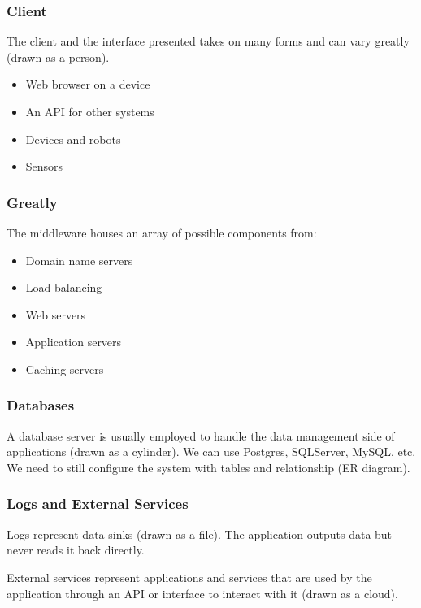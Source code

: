\subsubsection{Client}\label{ssub:clinet_was}

The client and the interface presented takes on many forms and can vary greatly (drawn as a person).
\begin{itemize}
	\item Web browser on a device
	\item An API for other systems
	\item Devices and robots
	\item Sensors
\end{itemize}

\subsubsection{Greatly}\label{ssub:greatly}

The middleware houses an array of possible components from:
\begin{itemize}
	\item Domain name servers
	\item Load balancing
	\item Web servers
	\item Application servers
	\item Caching servers
\end{itemize}

\subsubsection{Databases}\label{ssub:databases_was}

A database server is usually employed to handle the data management side of applications (drawn as a cylinder).
We can use Postgres, SQLServer, MySQL, etc.
We need to still configure the system with tables and relationship (ER diagram).

\subsubsection{Logs and External Services}\label{ssub:logs_and_external_services}

Logs represent data sinks (drawn as a file).
The application outputs data but never reads it back directly.

External services represent applications and services that are used by the application through an API or interface to interact with it (drawn as a cloud).


